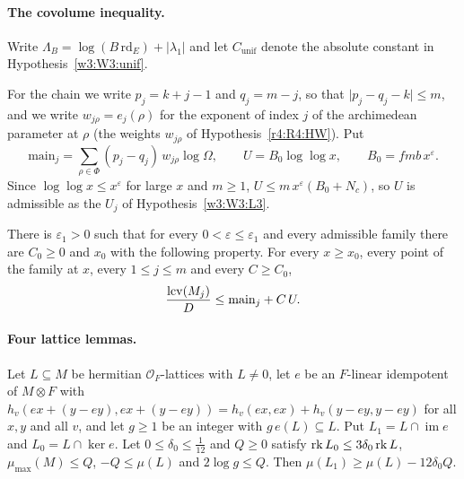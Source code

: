 \paragraph{The covolume inequality.}
Write $\Lambda_B=\log(B\,\mathrm{rd}_E)+|\lambda_1|$ and let $C_{\mathrm{unif}}$ denote the absolute constant in Hypothesis~\ref{w3:W3:unif}.

For the chain we write $p_j=k+j-1$ and $q_j=m-j$, so that $\lvert p_j-q_j-k\rvert\le m$, and we write $w_{j\rho}=e_{j}(\rho)$ for the exponent of index $j$ of the archimedean parameter at $\rho$ (the weights $w_{j\rho}$ of Hypothesis~\ref{r4:R4:HW}). Put
\[
\mathrm{main}_j=\sum_{\rho\in\Phi}(p_j-q_j)\,w_{j\rho}\log\Omega,\qquad U=B_0\log\log x,\qquad B_0=fmb\,x^\varepsilon .
\]
Since $\log\log x\le x^\varepsilon$ for large $x$ and $m\ge1$, $U\le m\,x^\varepsilon(B_0+N_c)$, so $U$ is admissible as the $U_j$ of Hypothesis~\ref{w3:W3:L3}.

\begin{hypothesis}\label{cov:H58}
There is $\varepsilon_1>0$ such that for every $0<\varepsilon\le\varepsilon_1$ and every admissible family there are $C_0\ge0$ and $x_0$ with the following property. For every $x\ge x_0$, every point of the family at $x$, every $1\le j\le m$ and every $C\ge C_0$,
\[
\frac{\operatorname{lcv}(M_j)}D\le\mathrm{main}_j+C\,U .
\]
\end{hypothesis}

\paragraph{Four lattice lemmas.}

\begin{lemma}[truncation]\label{cov:trunc}
Let $L\subseteq M$ be hermitian $\mathcal O_F$-lattices with $L\ne0$, let $e$ be an $F$-linear idempotent of $M\otimes F$ with $h_v(ex+(y-ey),ex+(y-ey))=h_v(ex,ex)+h_v(y-ey,y-ey)$ for all $x,y$ and all $v$, and let $g\ge1$ be an integer with $g\,e(L)\subseteq L$. Put $L_1=L\cap\operatorname{im}e$ and $L_0=L\cap\ker e$. Let $0\le\delta_0\le\frac1{12}$ and $Q\ge0$ satisfy $\operatorname{rk} L_0\le3\delta_0\operatorname{rk} L$, $\mu_{\max}(M)\le Q$, $-Q\le\mu(L)$ and $2\log g\le Q$. Then $\mu(L_1)\ge\mu(L)-12\delta_0Q$.
\end{lemma}

